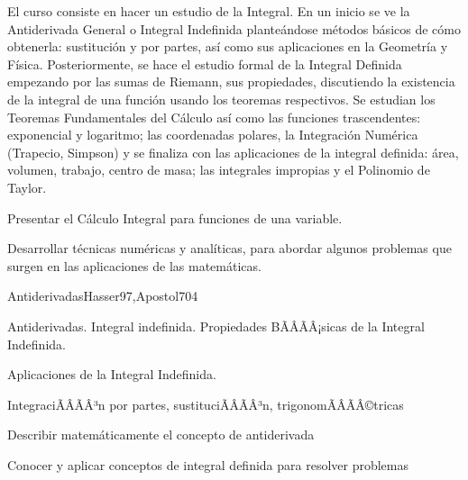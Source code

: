 \begin{sumilla}


\begin{fundamentacion}
El curso consiste en hacer un estudio de la Integral. En un inicio se ve la Antiderivada General o Integral Indefinida plante\'andose m\'etodos b\'asicos de c\'omo obtenerla: sustituci\'on y por partes, as\'i como sus aplicaciones en la Geometr\'ia y F\'isica. Posteriormente, se hace el estudio formal de la Integral Definida empezando por las sumas de Riemann, sus propiedades, discutiendo la existencia de la integral de una funci\'on usando los teoremas respectivos. Se estudian los Teoremas Fundamentales del C\'alculo as\'i como las funciones trascendentes: exponencial y logaritmo; las coordenadas polares, la Integraci\'on Num\'erica (Trapecio, Simpson) y se finaliza con las aplicaciones de la integral definida: \'area, volumen, trabajo, centro de masa; las integrales impropias y el Polinomio de Taylor.
\end{fundamentacion}

\begin{objetivosdelcurso}
\item Presentar el C\'alculo Integral para funciones de una variable.
\item Desarrollar t\'ecnicas num\'ericas y anal\'iticas, para abordar algunos problemas que surgen en las aplicaciones de las matem\'aticas.
\end{objetivosdelcurso}

\begin{outcomes}
\end{outcomes}

\begin{unit}{Antiderivadas}{Hasser97,Apostol70}{4}
\begin{topicos}
      \item Antiderivadas. Integral indefinida. Propiedades BÃÂÃÂ¡sicas de la  Integral Indefinida.
      \item Aplicaciones de la Integral Indefinida.
      \item IntegraciÃÂÃÂ³n por partes,  sustituciÃÂÃÂ³n, trigonomÃÂÃÂ©tricas
   \end{topicos}

   \begin{objetivos}
      \item Describir matem\'aticamente el concepto de antiderivada
      \item Conocer y aplicar conceptos de integral definida para resolver problemas
   \end{objetivos}
\end{unit}


\end{sumilla}
